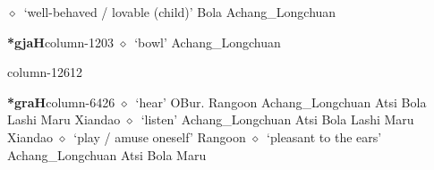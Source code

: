         $\diamond$~`well-behaved / lovable (child)'
         Bola 
\hspace{1ex}
         Achang\_Longchuan 
  \item {\footnotesize \textbf{*gjaH}}{\tiny column-1203}
         $\diamond$~`bowl'
         Achang\_Longchuan 
  \item {\footnotesize \textbf{}}{\tiny column-12612}
  \item {\footnotesize \textbf{*graH}}{\tiny column-6426}
         $\diamond$~`hear'
         OBur. 
\hspace{1ex}
         Rangoon 
\hspace{1ex}
         Achang\_Longchuan 
\hspace{1ex}
         Atsi 
\hspace{1ex}
         Bola 
\hspace{1ex}
         Lashi 
\hspace{1ex}
         Maru 
\hspace{1ex}
         Xiandao 
\hspace{1ex}
         $\diamond$~`listen'
         Achang\_Longchuan 
\hspace{1ex}
         Atsi 
\hspace{1ex}
         Bola 
\hspace{1ex}
         Lashi 
\hspace{1ex}
         Maru 
\hspace{1ex}
         Xiandao 
\hspace{1ex}
         $\diamond$~`play / amuse oneself'
         Rangoon 
\hspace{1ex}
         $\diamond$~`pleasant to the ears'
         Achang\_Longchuan 
\hspace{1ex}
         Atsi 
\hspace{1ex}
         Bola 
\hspace{1ex}
         Maru 
